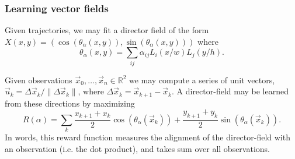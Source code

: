 \documentclass[12pt]{amsart}
\begin{document}
\subsubsection{Learning vector fields}
Given trajectories, we may fit a director field of the form $X(x,y) = ( \cos( \theta_\alpha(x,y) ) , \sin( \theta_\alpha(x,y) ) )$
where 
$$
	\theta_\alpha(x,y) = \sum_{ij} \alpha_{ij} L_i(x / w) L_j(y / h).
$$


Given observations $\vec{x}_0,  \dots, \vec{x}_n \in \mathbb{R}^2$ we may compute a series of unit vectors, $\vec{u}_k = \Delta \vec{x}_k / \| \Delta \vec{x}_k  \|$,
where $\Delta \vec{x}_k = \vec{x}_{k+1} - \vec{x}_k$.
A director-field may be learned from these directions by maximizing
$$
	R(\alpha ) = \sum_{k} \frac{x_{k+1} + x_k}{2} \cos( \theta_\alpha(\vec{x}_k) ) + \frac{y_{k+1} + y_k}{2}  \sin( \theta_\alpha( \vec{x}_k ) ).
$$
In words, this reward function measures the alignment of the director-field with an observation (i.e. the dot product), and takes sum over all observations.




\end{document}
